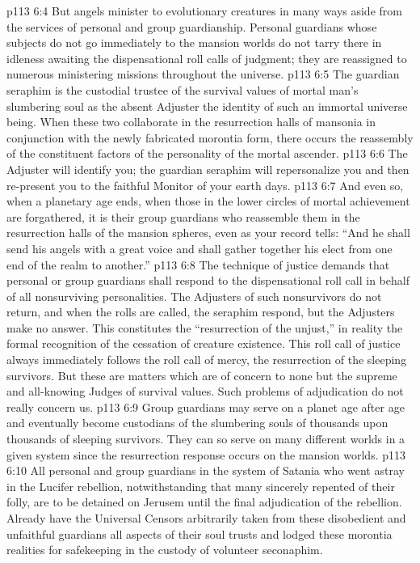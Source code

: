 \vs p113 6:4 \pc But angels minister to evolutionary creatures in many ways aside from the services of personal and group guardianship. Personal guardians whose subjects do not go immediately to the mansion worlds do not tarry there in idleness awaiting the dispensational roll calls of judgment; they are reassigned to numerous ministering missions throughout the universe.
\vs p113 6:5 The guardian seraphim is the custodial trustee of the survival values of mortal man’s slumbering soul as the absent Adjuster  the identity of such an immortal universe being. When these two collaborate in the resurrection halls of mansonia in conjunction with the newly fabricated morontia form, there occurs the reassembly of the constituent factors of the personality of the mortal ascender.
\vs p113 6:6 The Adjuster will identify you; the guardian seraphim will repersonalize you and then re\hyp{}present you to the faithful Monitor of your earth days.
\vs p113 6:7 And even so, when a planetary age ends, when those in the lower circles of mortal achievement are forgathered, it is their group guardians who reassemble them in the resurrection halls of the mansion spheres, even as your record tells: “And he shall send his angels with a great voice and shall gather together his elect from one end of the realm to another.”
\vs p113 6:8 \pc The technique of justice demands that personal or group guardians shall respond to the dispensational roll call in behalf of all nonsurviving personalities. The Adjusters of such nonsurvivors do not return, and when the rolls are called, the seraphim respond, but the Adjusters make no answer. This constitutes the “resurrection of the unjust,” in reality the formal recognition of the cessation of creature existence. This roll call of justice always immediately follows the roll call of mercy, the resurrection of the sleeping survivors. But these are matters which are of concern to none but the supreme and all\hyp{}knowing Judges of survival values. Such problems of adjudication do not really concern us.
\vs p113 6:9 \pc Group guardians may serve on a planet age after age and eventually become custodians of the slumbering souls of thousands upon thousands of sleeping survivors. They can so serve on many different worlds in a given system since the resurrection response occurs on the mansion worlds.
\vs p113 6:10 All personal and group guardians in the system of Satania who went astray in the Lucifer rebellion, notwithstanding that many sincerely repented of their folly, are to be detained on Jerusem until the final adjudication of the rebellion. Already have the Universal Censors arbitrarily taken from these disobedient and unfaithful guardians all aspects of their soul trusts and lodged these morontia realities for safekeeping in the custody of volunteer seconaphim.
